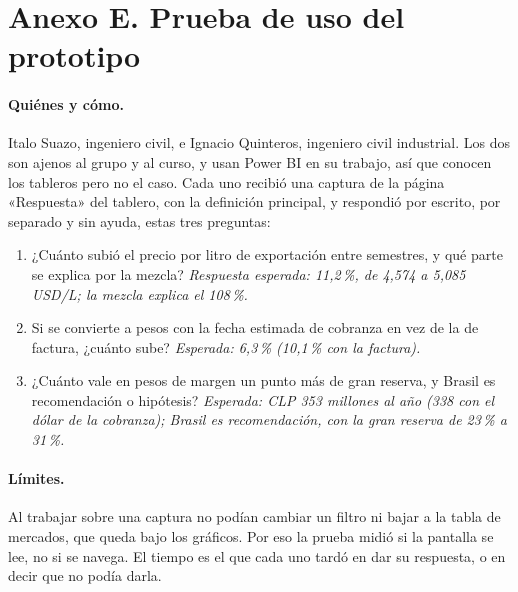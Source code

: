 
\section*{Anexo E. Prueba de uso del prototipo}

\paragraph{Quiénes y cómo.} Italo Suazo, ingeniero civil, e Ignacio Quinteros, ingeniero civil industrial. Los dos son ajenos al grupo y al curso, y usan Power BI en su trabajo, así que conocen los tableros pero no el caso. Cada uno recibió una captura de la página «Respuesta» del tablero, con la definición principal, y respondió por escrito, por separado y sin ayuda, estas tres preguntas:

\begin{enumerate}\itemsep0pt
\item ¿Cuánto subió el precio por litro de exportación entre semestres, y qué parte se explica por la mezcla? \emph{Respuesta esperada: 11,2\,\%, de 4,574 a 5,085 USD/L; la mezcla explica el 108\,\%.}
\item Si se convierte a pesos con la fecha estimada de cobranza en vez de la de factura, ¿cuánto sube? \emph{Esperada: 6,3\,\% (10,1\,\% con la factura).}
\item ¿Cuánto vale en pesos de margen un punto más de gran reserva, y Brasil es recomendación o hipótesis? \emph{Esperada: CLP 353 millones al año (338 con el dólar de la cobranza); Brasil es recomendación, con la gran reserva de 23\,\% a 31\,\%.}
\end{enumerate}

\paragraph{Límites.} Al trabajar sobre una captura no podían cambiar un filtro ni bajar a la tabla de mercados, que queda bajo los gráficos. Por eso la prueba midió si la pantalla se lee, no si se navega. El tiempo es el que cada uno tardó en dar su respuesta, o en decir que no podía darla.

